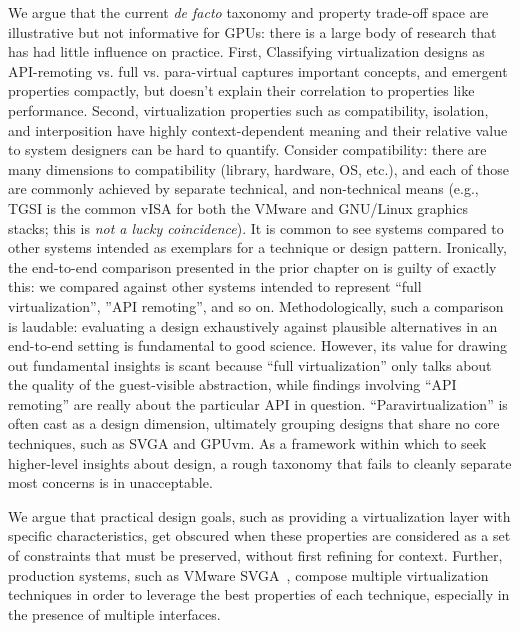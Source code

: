 We argue that the current \emph{de facto} taxonomy and property trade-off space
are illustrative but not informative for GPUs:
there is a large body of research that has had little influence on practice.
First, Classifying virtualization designs as API-remoting vs. full vs.
para-virtual captures important concepts, and emergent properties compactly,
but doesn't explain their correlation to properties like performance.
Second, virtualization properties such as compatibility, isolation, and
interposition have highly context-dependent meaning and their relative value
to system designers can be hard to quantify.
Consider compatibility: there are many dimensions to compatibility (library,
hardware, OS, etc.), and each of those are commonly achieved by separate
technical, and non-technical means (e.g., TGSI is the common vISA for both the
VMware and GNU/Linux graphics stacks; this is \emph{not a lucky coincidence}).
It is common to see systems compared to other systems intended as exemplars
for a technique or design pattern. Ironically, the end-to-end comparison
presented in the prior chapter on \Trillium is guilty of exactly this: we
compared \Trillium against other systems intended to represent ``full
virtualization'', ''API remoting'', and so on.
Methodologically, such a comparison is laudable: evaluating a design
exhaustively against plausible alternatives in an end-to-end setting is
fundamental to good science. However, its value for drawing out fundamental
insights is scant because ``full virtualization'' only talks about the quality
of the guest-visible abstraction, while findings involving ``API remoting''
are really about the particular API in question. ``Paravirtualization'' is
often cast as a design dimension, ultimately grouping designs that share no
core techniques, such as SVGA and GPUvm. As a framework within which to seek
higher-level insights about design, a rough taxonomy that fails to cleanly
separate most concerns is in unacceptable.

We argue that practical design goals, such as providing a virtualization layer
with specific characteristics, get obscured when these properties are
considered as a set of constraints that must be preserved, without first
refining for context.
Further, production systems, such as VMware SVGA~\cite{dowty2009gpu},
compose multiple virtualization techniques in order to leverage the best
properties of each technique, especially in the presence of multiple
interfaces.

